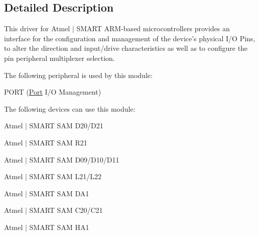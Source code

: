 \subsection{Detailed Description}
This driver for Atmel\textregistered{} $\vert$ S\+M\+A\+R\+T A\+R\+M\textregistered{}-\/based microcontrollers provides an interface for the configuration and management of the device's physical I/\+O Pins, to alter the direction and input/drive characteristics as well as to configure the pin peripheral multiplexer selection.

The following peripheral is used by this module\+:
\begin{DoxyItemize}
\item P\+O\+R\+T (\hyperlink{struct_port}{Port} I/\+O Management)
\end{DoxyItemize}

The following devices can use this module\+:
\begin{DoxyItemize}
\item Atmel $\vert$ S\+M\+A\+R\+T S\+A\+M D20/\+D21
\item Atmel $\vert$ S\+M\+A\+R\+T S\+A\+M R21
\item Atmel $\vert$ S\+M\+A\+R\+T S\+A\+M D09/\+D10/\+D11
\item Atmel $\vert$ S\+M\+A\+R\+T S\+A\+M L21/\+L22
\item Atmel $\vert$ S\+M\+A\+R\+T S\+A\+M D\+A1
\item Atmel $\vert$ S\+M\+A\+R\+T S\+A\+M C20/\+C21
\item Atmel $\vert$ S\+M\+A\+R\+T S\+A\+M H\+A1
\end{DoxyItemize}

